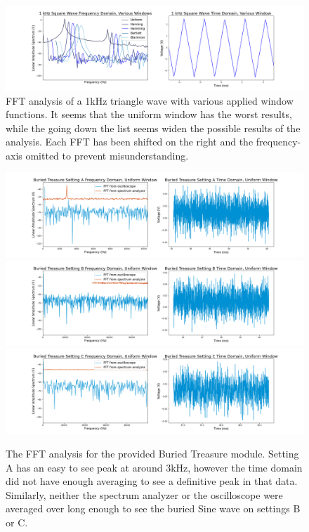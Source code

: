 \documentclass[12pt]{article}
\begin{document}
\begin{figure}
\centering
    \includegraphics[width=\textwidth]{Variety of Windows}
	\caption{FFT analysis of a 1kHz triangle wave with various applied window functions. It seems that the uniform window has the worst results, while the going down the list seems widen the possible results of the analysis. Each FFT has been shifted on the right and the frequency-axis omitted to prevent misunderstanding.}
    \label{fig:various_windows}
\end{figure} %

\begin{figure}[!ht]
    \centering
    \includegraphics[width=\textwidth]{Buried Treasure Setting A (uniform)}
    \includegraphics[width=\textwidth]{Buried Treasure Setting B (uniform)}
    \includegraphics[width=\textwidth]{Buried Treasure Setting C (uniform)}
    \caption{The FFT analysis for the provided Buried Treasure module. Setting A has an easy to see peak at around 3kHz, however the time domain did not have enough averaging to see a definitive peak in that data. Similarly, neither the spectrum analyzer or the oscilloscope were averaged over long enough to see the buried Sine wave on settings B or C.}
    \label{fig:buried}
\end{figure} %
    
\end{document}
